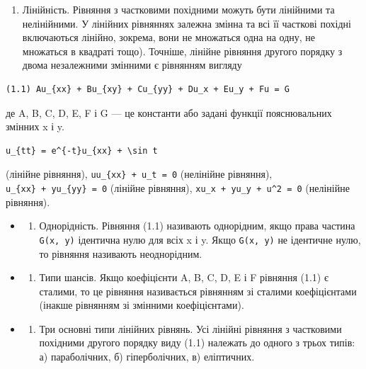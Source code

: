 \documentclass[
  ukrainian,
]{article}
\providecommand{\tightlist}{%
  \setlength{\itemsep}{0pt}\setlength{\parskip}{0pt}}
\begin{document}
\begin{enumerate}
\def\labelenumi{\arabic{enumi}.}
\setcounter{enumi}{2}
\tightlist
\item
  Лінійність. Рівняння з частковими похідними можуть бути лінійними та
  нелінійними. У лінійних рівняннях залежна змінна та всі її часткові
  похідні включаються лінійно, зокрема, вони не множаться одна на одну,
  не множаться в квадраті тощо). Точніше, лінійне рівняння другого
  порядку з двома незалежними змінними є рівнянням вигляду
\end{enumerate}

\begin{verbatim}
(1.1) Au_{xx} + Bu_{xy} + Cu_{yy} + Du_x + Eu_y + Fu = G
\end{verbatim}

де A, B, C, D, E, F і G --- це константи або задані функції
пояснювальних змінних x і y.

\begin{verbatim}
u_{tt} = e^{-t}u_{xx} + \sin t
\end{verbatim}

(лінійне рівняння), \texttt{uu\_\{xx\}\ +\ u\_t\ =\ 0} (нелінійне
рівняння), \texttt{u\_\{xx\}\ +\ yu\_\{yy\}\ =\ 0} (лінійне рівняння),
\texttt{xu\_x\ +\ yu\_y\ +\ u\^{}2\ =\ 0} (нелінійне рівняння).

\begin{itemize}
\tightlist
\item
  \begin{enumerate}
  \def\labelenumi{\arabic{enumi}.}
  \setcounter{enumi}{3}
  \tightlist
  \item
    Однорідність. Рівняння (1.1) називають однорідним, якщо права
    частина \texttt{G(x,\ y)} ідентична нулю для всіх x і y. Якщо
    \texttt{G(x,\ y)} не ідентичне нулю, то рівняння називають
    неоднорідним.
  \end{enumerate}
\item
  \begin{enumerate}
  \def\labelenumi{\arabic{enumi}.}
  \setcounter{enumi}{4}
  \tightlist
  \item
    Типи шансів. Якщо коефіцієнти A, B, C, D, E і F рівняння (1.1) є
    сталими, то це рівняння називається рівнянням зі сталими
    коефіцієнтами (інакше рівнянням зі змінними коефіцієнтами).
  \end{enumerate}
\item
  \begin{enumerate}
  \def\labelenumi{\arabic{enumi}.}
  \setcounter{enumi}{5}
  \tightlist
  \item
    Три основні типи лінійних рівнянь. Усі лінійні рівняння з частковими
    похідними другого порядку виду (1.1) належать до одного з трьох
    типів: а) параболічних, б) гіперболічних, в) еліптичних.
  \end{enumerate}
\end{itemize}
\end{document}
